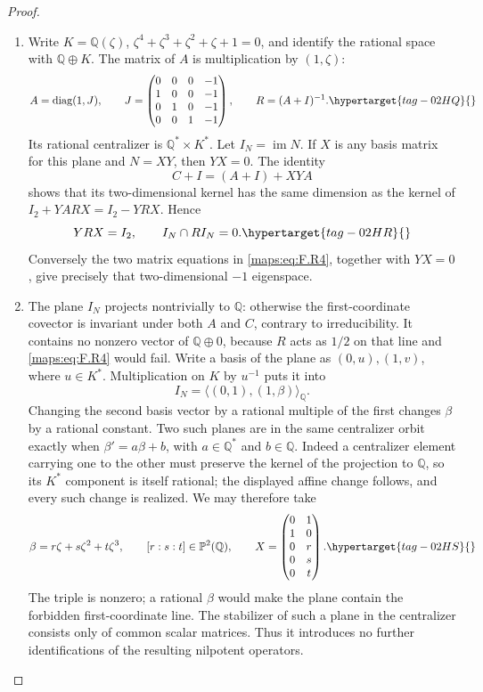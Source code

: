 \documentclass[11pt,a4paper]{article}
\numberwithin{equation}{section}
\theoremstyle{definition}
\begin{document}
\begin{proof}
\begin{enumerate}[label=\arabic*.]
\item Write $K=\mathbb Q(\zeta)$, $\zeta^4+\zeta^3+\zeta^2+
\zeta+1=0$, and identify the rational space with
$\mathbb Q\oplus K$.  The matrix of $A$ is multiplication by
$(1,\zeta)$:
\begin{equation}
 A=\operatorname{diag}(1,J),\qquad
 J=\begin{pmatrix}
 0&0&0&-1\\1&0&0&-1\\0&1&0&-1\\0&0&1&-1
 \end{pmatrix},\qquad R=(A+I)^{-1}.
 \hypertarget{tag-02HQ}{}\label{maps:eq:F.R3}
\end{equation}
Its rational centralizer is $\mathbb Q^*\times K^*$.
Let $I_N=\operatorname{im}N$.  If $X$ is any basis matrix
for this plane and $N=XY$, then $YX=0$.
The identity
\[
 C+I=(A+I)+XYA
\]
shows that its two-dimensional kernel has the same dimension
as the kernel of
$I_2+YARX=I_2-YRX$.  Hence
\begin{equation}
 YRX=I_2,
 \qquad I_N\cap RI_N=0.
 \hypertarget{tag-02HR}{}\label{maps:eq:F.R4}
\end{equation}
Conversely the two matrix equations in \eqref{maps:eq:F.R4}, together with
$YX=0$, give precisely that two-dimensional $-1$ eigenspace.

\item The plane $I_N$ projects nontrivially to $\mathbb Q$:
otherwise the first-coordinate covector is invariant under
both $A$ and $C$, contrary to irreducibility.
It contains no nonzero vector of $\mathbb Q\oplus0$,
because $R$ acts as $1/2$ on that line and \eqref{maps:eq:F.R4} would fail.
Write a basis of the plane as $(0,u),(1,v)$, where
$u\in K^*$.  Multiplication on $K$ by $u^{-1}$ puts it into
\[
 I_N=\langle(0,1),(1,\beta)\rangle_{\mathbb Q}.
\]
Changing the second basis vector by a rational multiple of
the first changes $\beta$ by a rational constant.
Two such planes are in the same centralizer orbit exactly
when $\beta'=a\beta+b$, with $a\in\mathbb Q^*$ and
$b\in\mathbb Q$.  Indeed a centralizer element carrying
one to the other must preserve the kernel of the projection
to $\mathbb Q$, so its $K^*$ component is itself rational;
the displayed affine change follows, and every such change
is realized.  We may therefore take
\begin{equation}
 \beta=r\zeta+s\zeta^2+t\zeta^3,
 \qquad [r:s:t]\in\mathbb P^2(\mathbb Q),
 \qquad
 X=\begin{pmatrix}0&1\\1&0\\0&r\\0&s\\0&t\end{pmatrix}.
 \hypertarget{tag-02HS}{}\label{maps:eq:F.R5}
\end{equation}
The triple is nonzero; a rational $\beta$ would make the
plane contain the forbidden first-coordinate line.
The stabilizer of such a plane in the centralizer consists
only of common scalar matrices.  Thus it introduces no
further identifications of the resulting nilpotent operators.


\end{enumerate}
\end{proof}
\end{document}
